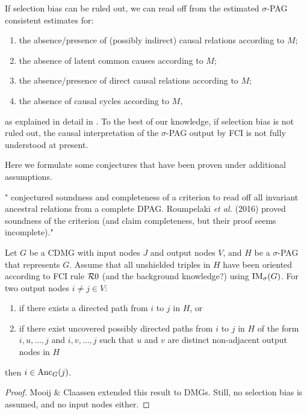 If selection bias can be ruled out, we can read off from the estimated $\sigma$-PAG consistent estimates for:
  \begin{enumerate}[label=(\roman*)]
  \item the absence/presence of (possibly indirect) causal relations according to $M$; 
  \item the absence of latent common causes according to $M$;
  \item the absence/presence of direct causal relations according to $M$;
  \item the absence of causal cycles according to $M$,
  \end{enumerate}
as explained in detail in \cite{MooijClaassen_UAI_20}.
To the best of our knowledge, if selection bias is not ruled out, the causal interpretation of the $\sigma$-PAG output by FCI is not fully understood at present.

Here we formulate some conjectures that have been proven under additional assumptions.

"\cite{Zhang2006} conjectured soundness and completeness of a criterion to read off all invariant ancestral relations from a complete DPAG.
Roumpelaki \emph{et al.} (2016) proved soundness of the criterion (and claim completeness, but their proof seems incomplete)."
\begin{Prp}
Let $G$ be a CDMG with input nodes $J$ and output nodes $V$, and $H$ be a $\sigma$-PAG that represents $G$.
Assume that all unshielded triples in $H$ have been oriented according to FCI rule $\mathcal{R}0$ (and the background knowledge?) using $\mathrm{IM}_\sigma(G)$.
For two output nodes $i \ne j \in V$:
  \begin{enumerate}
    \item if there exists a directed path from $i$ to $j$ in $H$, or
    \item if there exist uncovered possibly directed paths from $i$ to $j$ in $H$ of the form $i, u, \dots, j$ and $i, v, \dots, j$ such that $u$ and $v$ are distinct non-adjacent output nodes in $H$
  \end{enumerate}
then $i \in \mathrm{Anc}_G(j)$.
\end{Prp}
\begin{proof}
  Mooij \& Claassen extended this result to DMGs.
  Still, no selection bias is assumed, and no input nodes either.
\end{proof}

